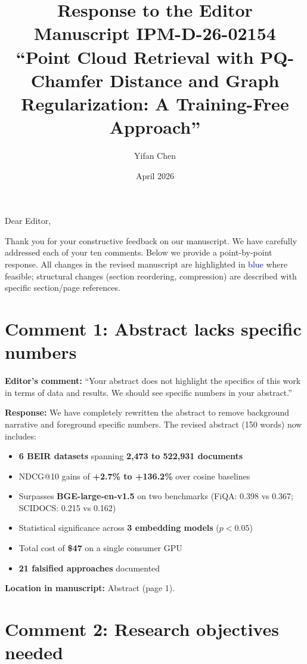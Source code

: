\documentclass[11pt]{article}
\title{Response to the Editor\\
\large Manuscript IPM-D-26-02154\\[6pt]
\normalsize ``Point Cloud Retrieval with PQ-Chamfer Distance and Graph Regularization: A Training-Free Approach''}
\author{Yifan Chen}
\date{April 2026}
\begin{document}
\maketitle

Dear Editor,

Thank you for your constructive feedback on our manuscript. We have carefully addressed each of your ten comments. Below we provide a point-by-point response. All changes in the revised manuscript are highlighted in \textcolor{blue}{blue} where feasible; structural changes (section reordering, compression) are described with specific section/page references.

\section*{Comment 1: Abstract lacks specific numbers}

\textbf{Editor's comment:} ``Your abstract does not highlight the specifics of this work in terms of data and results. We should see specific numbers in your abstract.''

\textbf{Response:} We have completely rewritten the abstract to remove background narrative and foreground specific numbers. The revised abstract (150 words) now includes:
\begin{itemize}[leftmargin=*]
\item \textbf{6 BEIR datasets} spanning \textbf{2,473 to 522,931 documents}
\item NDCG@10 gains of \textbf{+2.7\% to +136.2\%} over cosine baselines
\item Surpasses \textbf{BGE-large-en-v1.5} on two benchmarks (FiQA: 0.398 vs 0.367; SCIDOCS: 0.215 vs 0.162)
\item Statistical significance across \textbf{3 embedding models} ($p < 0.05$)
\item Total cost of \textbf{\$47} on a single consumer GPU
\item \textbf{21 falsified approaches} documented
\end{itemize}

\textbf{Location in manuscript:} Abstract (page 1).

\section*{Comment 2: Research objectives needed}
\end{document}
